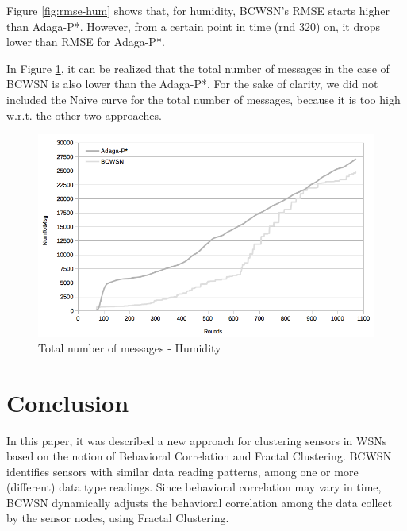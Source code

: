 \documentclass{acm_proc_article-sp}
\begin{document}
Figure \ref{fig:rmse-hum} shows that, for humidity, BCWSN's RMSE starts higher
than Adaga-P*. However, from a certain point in time (rnd 320) on, it drops
lower than RMSE for Adaga-P*.
\vspace*{-.3cm}

In Figure \ref{fig:tot-num-msg-hum}, it can be realized that the total number of
messages in the case of BCWSN is also lower than the Adaga-P*. For the sake of
clarity, we did not included the Naive curve for the total number of messages,
because it is too high w.r.t. the other two approaches.
\vspace*{-.3cm}

\begin{figure}[!htb]
\begin{center}
	\includegraphics[scale=0.3]{BCWSN-TotNumMsgxRound-PB-Hum.png}
	 \vspace*{-.6cm}
    \caption{Total number of messages - Humidity}
    \label{fig:tot-num-msg-hum}
\end{center}
\end{figure}
\vspace*{-.3cm}

\section{Conclusion}
\label{conclusion}

In this paper, it was described a new approach for clustering sensors in WSNs
based on the notion of Behavioral Correlation and Fractal Clustering.
BCWSN identifies sensors with similar data reading patterns, among one or more
(different) data type readings. Since behavioral correlation may vary in time,
BCWSN dynamically adjusts the behavioral correlation among the data collect by
the sensor nodes, using Fractal Clustering.
\vspace*{-.3cm}
\end{document}
